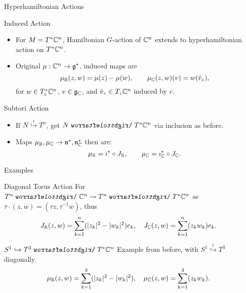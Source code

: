 \begin{frame}{Hyperhamiltonian Actions}
    \begin{block}{Induced Action}
        \begin{itemize}
            \item For $M = T^{\ast}\mathbb{C}^{n}$, Hamiltonian $G$-action of $\mathbb{C}^{n}$ extends to hyperhamiltonian action on $T^{\ast}\mathbb{C}^{n}$.
            \item Original $\mu : \mathbb{C}^{n} \rightarrow \mathfrak{g}^{\ast}$, induced maps are
            \vspace*{-6pt}
            $$ \mu_{\mathbb{R}}(z,w) = \mu(z) - \mu(w), \qquad \mu_{\mathbb{C}}(z,w)(v) = w(\hat{v}_{z}), $$
            \vspace*{-6pt}
            for $w \in T^{\ast}_{z}\mathbb{C}^{n}$, $v \in \mathfrak{g}_{\mathbb{C}}$, and $\hat{v}_{z} \in T_{z}\mathbb{C}^{n}$ induced by $v$.
        \end{itemize}
    \end{block}
    \begin{block}{Subtori Action}
        \begin{itemize}
            \item If $N \overset{\imath}{\hookrightarrow} T^{n}$, get $N \acts T^{\ast}\CC^{n}$ via inclusion as before.
            \item Maps $\mu_{\mathbb{R}}, \mu_{\mathbb{C}} \rightarrow \mathfrak{n}^{\ast}, \mathfrak{n}^{\ast}_{\mathbb{C}}$ then are:
            \vspace*{-6pt}
            $$ \mu_{\mathbb{R}} = \imath^{\ast} \circ J_{\mathbb{R}}, \qquad \mu_{\mathbb{C}} = \imath^{\ast}_{\mathbb{C}} \circ J_{\mathbb{C}}. $$
            \vspace*{-12pt}
        \end{itemize}
    \end{block}
\end{frame}

\begin{frame}{Examples}
    \begin{block}{Diagonal Torus Action}
        For $T^{n} \acts \CC^{n} \rightsquigarrow T^{n} \acts T^{\ast}\CC^{n}$ as $\tau \cdot (z,w) = (\tau z, \tau^{-1}w)$, thus
        $$ J_{\mathbb{R}}(z,w) = \sum_{k=1}^{n} ( |z_{k}|^{2} - |w_{k}|^{2} )e_{k}, \quad J_{\mathbb{C}}(z,w) = \sum_{k=1}^{n}(z_{k}w_{k})e_{k}. $$
    \end{block}
    \begin{block}{$S^{1} \hookrightarrow T^{3} \acts T^{\ast}\CC^{n}$}
        Example from before, with $S^{1} \overset{\imath}{\hookrightarrow} T^{3}$ diagonally.
        $$ \mu_{\mathbb{R}}(z,w) = \sum_{k=1}^{3} ( |z_{k}|^{2} - |w_{k}|^{2} ), \quad \mu_{\mathbb{C}}(z,w) = \sum_{k=1}^{3}(z_{k}w_{k}). $$
    \end{block}
\end{frame}

